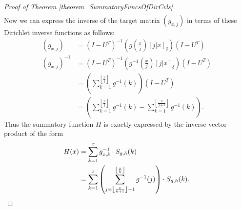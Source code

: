 \documentclass[11pt,reqno,a4letter]{article}
\numberwithin{figure}{section}
\numberwithin{table}{section}
\newcommand{\Iverson}[1]{\ensuremath{\left[#1\right]_{\delta}}}
\newcommand{\floor}[1]{\left\lfloor #1 \right\rfloor}
\theoremstyle{plain}
\numberwithin{theorem}{section}
\theoremstyle{definition}
\begin{document}
\begin{proof}[Proof of Theorem \ref{theorem_SummatoryFuncsOfDirCvls}]
\begin{align*}
\end{align*} 
Now we can express the inverse of the target matrix $(g_{x,j})$ in terms of these Dirichlet inverse functions 
as follows: 
\begin{align*} 
(g_{x,j}) & = (I-U^{T})^{-1} \left(g\left(\frac{x}{j}\right) \Iverson{j|x}\right) (I-U^{T}) \\ 
(g_{x,j})^{-1} & = (I-U^{T})^{-1} \left(g^{-1}\left(\frac{x}{j}\right) \Iverson{j|x}\right) (I-U^{T}) \\ 
     & = \left(\sum_{k=1}^{\floor{\frac{x}{j}}} g^{-1}(k)\right) (I-U^{T}) \\ 
     & = \left(\sum_{k=1}^{\floor{\frac{x}{j}}} g^{-1}(k) - \sum_{k=1}^{\floor{\frac{x}{j+1}}} g^{-1}(k)\right). 
\end{align*} 
Thus the summatory function $H$ is exactly expressed by the inverse vector product of the form 
\begin{align*} 
H(x) & = \sum_{k=1}^x g_{x,k}^{-1} \cdot S_{g,h}(k) \\ 
     & = \sum_{k=1}^x \left(\sum_{j=\floor{\frac{x}{k+1}}+1}^{\floor{\frac{x}{k}}} g^{-1}(j)\right) \cdot S_{g,h}(k). 
     \qedhere
\end{align*} 
\end{proof} 
\end{document}
